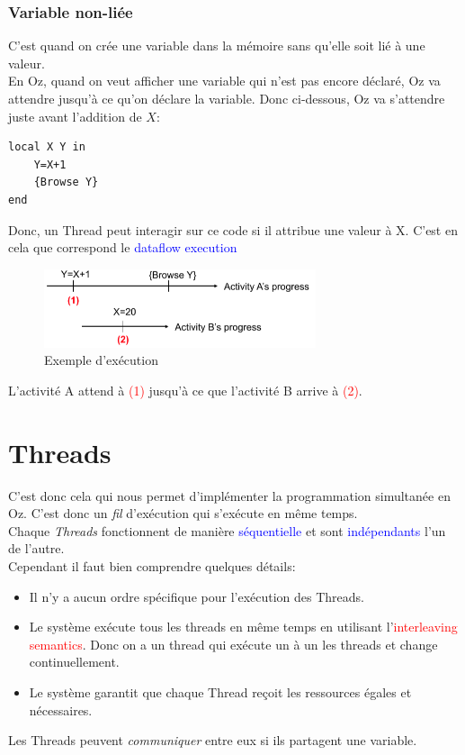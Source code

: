 \documentclass{report}
\begin{document}
\subsubsection{Variable non-liée}
C'est quand on crée une variable dans la mémoire sans qu'elle soit lié à une valeur.\\
En Oz, quand on veut afficher une variable qui n'est pas encore déclaré, Oz va attendre jusqu'à ce qu'on déclare la variable. Donc ci-dessous, Oz va s'attendre juste avant l'addition de $X$:
\begin{lstlisting}[escapechar=\%]
local X Y in
	Y=X+1
	{Browse Y}
end
\end{lstlisting}
Donc, un Thread peut interagir sur ce code si il attribue une valeur à X. C'est en cela que correspond le \textcolor{blue}{dataflow execution}
\begin{figure}[H]
\centering
\includegraphics[width=8cm]{img/dataflow.png}
\caption{Exemple d'exécution}
\end{figure}
L'activité A attend à \textcolor{red}{(1)} jusqu'à ce que l'activité B arrive à \textcolor{red}{(2)}.

\section{Threads}
C'est donc cela qui nous permet d'implémenter la programmation simultanée en Oz. C'est donc un \textit{fil} d'exécution qui s'exécute en même temps.\\
Chaque \textit{Threads} fonctionnent de manière \textcolor{blue}{séquentielle} et sont \textcolor{blue}{indépendants} l'un de l'autre.\\
Cependant il faut bien comprendre quelques détails:
\begin{itemize}
\item Il n'y a aucun ordre spécifique pour l'exécution des Threads.
\item Le système exécute tous les threads en même temps en utilisant l'\textcolor{red}{interleaving semantics}. Donc on a un thread qui exécute un à un les threads et change continuellement.
\item Le système garantit que chaque Thread reçoit les ressources égales et nécessaires.
\end{itemize}
Les Threads peuvent \textit{communiquer} entre eux si ils partagent une variable.\\
\end{document}

